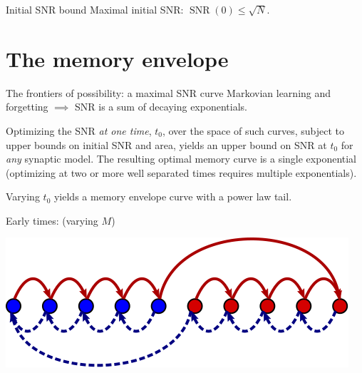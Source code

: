 \documentclass[final,hyperref={pdfpagelabels=false,bookmarks=false}]{beamer}
\DeclareMathOperator{\snr}{SNR}
\begin{document}
\begin{frame}{}
\begin{columns}[t]
\begin{column}{0.3\linewidth}
\begin{block}{Initial SNR bound}
 \vp Maximal initial SNR:\hspace{2cm}
 $
   \snr(0) \leq \sqrt{N}.
 $
%
\end{block}


\section{The memory envelope}



\begin{block}{The frontiers of possibility: a maximal SNR curve}
%
 Markovian learning and forgetting $\implies$ SNR is a sum of decaying exponentials.

 \vp Optimizing the SNR \emph{at one time}, $t_0$, over the space of such curves,
 subject to upper bounds on initial SNR and area,
 yields an upper bound on SNR at $t_0$ for \emph{any} synaptic model.
 The resulting optimal memory curve is a single exponential
 (optimizing at two or more well separated times requires multiple exponentials).

 \vp Varying $t_0$ yields a memory envelope curve with a power law tail.

\vp
\parbox[c]{0.45\linewidth}{
 \begin{center}
 \end{center}
}
\hspace{0.5cm}
\parbox[c]{0.45\linewidth}{
   Early times: (varying $M$)
   \begin{center}
     \includegraphics[width=0.7\linewidth]{diffjump.svg}
   \end{center}

}
\end{block}
\end{column}
\end{columns}
\end{frame}
\end{document}
